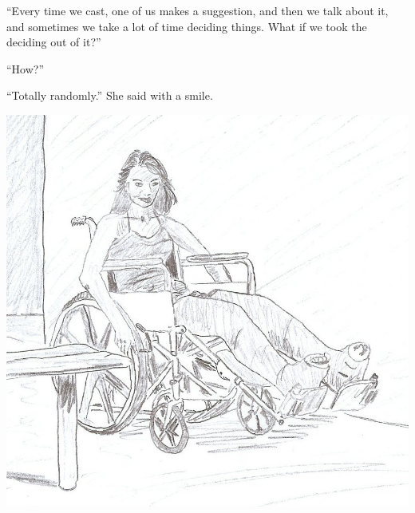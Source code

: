 ``Every time we cast, one of us makes a suggestion, and then we talk about it, and sometimes
we take a lot of time deciding things. What if we took the deciding out of it?''

``How?''

``Totally randomly.'' She said with a smile.

\newpage
\begin{center}
\includegraphics{images/kicks35.jpg}
\end{center}
